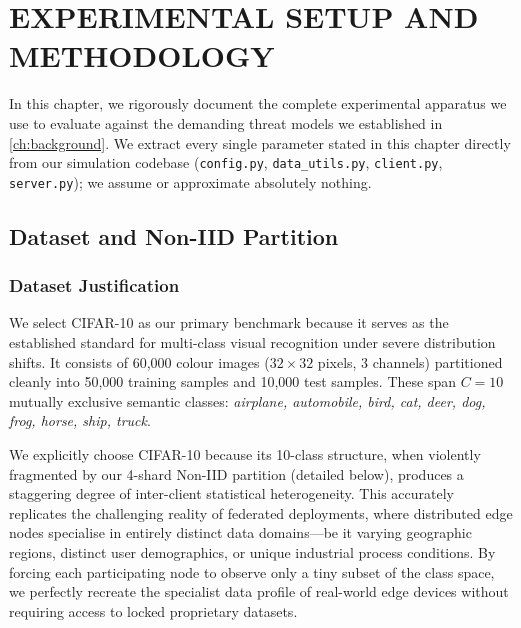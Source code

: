 \documentclass[../main.tex]{subfiles}
\begin{document}
\chapter{EXPERIMENTAL SETUP AND METHODOLOGY}
\label{ch:experiments}

In this chapter, we rigorously document the complete experimental apparatus we use to evaluate \aegis{} against the demanding threat models we established in \cref{ch:background}. We extract every single parameter stated in this chapter directly from our simulation codebase (\texttt{config.py}, \texttt{data\_utils.py}, \texttt{client.py}, \texttt{server.py}); we assume or approximate absolutely nothing.

\section{Dataset and Non-IID Partition}
\label{sec:exp_dataset}

\subsection{Dataset Justification}
\label{sec:exp_cifar10}

We select CIFAR-10 \citep{krizhevsky2009learning} as our primary benchmark because it serves as the established standard for multi-class visual recognition under severe distribution shifts. It consists of 60,000 colour images ($32 \times 32$ pixels, 3 channels) partitioned cleanly into 50,000 training samples and 10,000 test samples. These span $C = 10$ mutually exclusive semantic classes: \textit{airplane, automobile, bird, cat, deer, dog, frog, horse, ship, truck}.

We explicitly choose CIFAR-10 because its 10-class structure, when violently fragmented by our 4-shard Non-IID partition (detailed below), produces a staggering degree of inter-client statistical heterogeneity. This accurately replicates the challenging reality of federated deployments, where distributed edge nodes specialise in entirely distinct data domains---be it varying geographic regions, distinct user demographics, or unique industrial process conditions. By forcing each participating node to observe only a tiny subset of the class space, we perfectly recreate the specialist data profile of real-world edge devices without requiring access to locked proprietary datasets.
\end{document}
